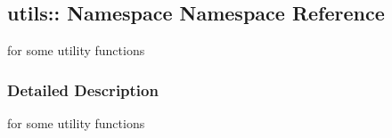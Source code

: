 \hypertarget{namespaceutils_1_1
Namespace}{}\subsection{utils\+:\+: Namespace Namespace Reference}
\label{namespaceutils_1_1
Namespace}


for some utility functions  




\subsubsection{Detailed Description}
for some utility functions 